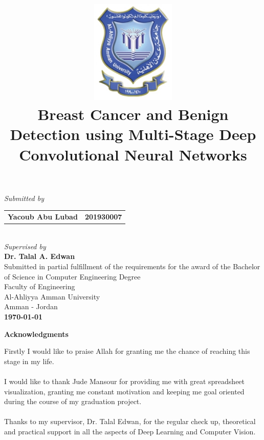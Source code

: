 \documentclass[12pt]{extarticle}
\title{\includegraphics[width=4cm]{pics/AAU_Logo.jpg}\\\Large{\textbf{Breast Cancer and Benign Detection using Multi-Stage Deep Convolutional Neural Networks}}
\date{}}
\begin{document}
	\clearpage\maketitle
	\begin{center}
		\vspace{-1.5cm}
		\large{\emph{Submitted by}}\\\vspace{0.5cm}
		\begin{tabular}{l l}
			
			\multicolumn{1}{p{6cm}}{ \large{\textbf{Yacoub Abu Lubad}}} &  \multicolumn{1}{p{6cm}}{\centering \large{\textbf{201930007}}} 
		\end{tabular}\\\vspace{1cm}
		\large{\emph{Supervised by}}\\\vspace{0.5cm}
		\large{\textbf{Dr. Talal A. Edwan}}\\\vspace{1cm}
		{Submitted in partial fulfillment of the requirements for the award of the Bachelor of Science in Computer Engineering Degree\\\vspace{1cm}
		Faculty of Engineering\\Al-Ahliyya Amman University\\Amman - Jordan}\\ \vspace{0.5cm}
		\Large{\textbf{\monthyeardate\today}}
		
		\thispagestyle{empty}
	\end{center}
	\newpage
	\setcounter{page}{1}
	\begin{center}
	\Large{\textbf{Acknowledgments}}\\ \vspace{1cm}
	\end{center}
	Firstly I would like to praise Allah for granting me the chance of reaching this stage in my life.\\\\
	I would like to thank Jude Mansour for providing me with great spreadsheet visualization, granting me constant motivation and keeping me goal oriented during the course of my graduation project.\\\\
	Thanks to my supervisor, Dr. Talal Edwan, for the regular check up, theoretical and practical support in all the aspects of Deep Learning and Computer Vision.\\\\
\end{document}
